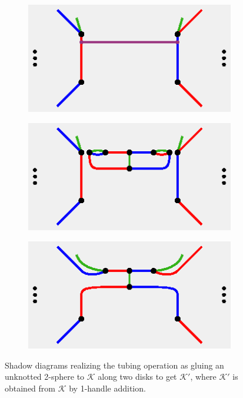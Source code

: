 \documentclass[11pt, oneside]{amsart}
\theoremstyle{theorem}
\theoremstyle{definition}
\newcommand{\K}{\mathcal{K}}
\theoremstyle{theorem}
\begin{document}
\begin{figure}[h!]
\begin{subfigure}{.33\textwidth}
  \centering
  \includegraphics[width=.9\linewidth]{tube3.eps}
  \caption{}
  \label{tubing1}
\end{subfigure}%
\begin{subfigure}{.33\textwidth}
  \centering
  \includegraphics[width=.9\linewidth]{tube4.eps}
  \caption{}
  \label{tubing2}
\end{subfigure}
\begin{subfigure}{.33\textwidth}
  \centering
  \includegraphics[width=.9\linewidth]{tube5.eps}
  \caption{}
  \label{tubing3}
\end{subfigure}
\caption{Shadow diagrams realizing the tubing operation as gluing an unknotted 2-sphere to $\K$ along two disks to get $\K'$, where $\K'$ is obtained from $\K$ by 1-handle addition.}
\label{tubings}
\end{figure}
\end{document}
